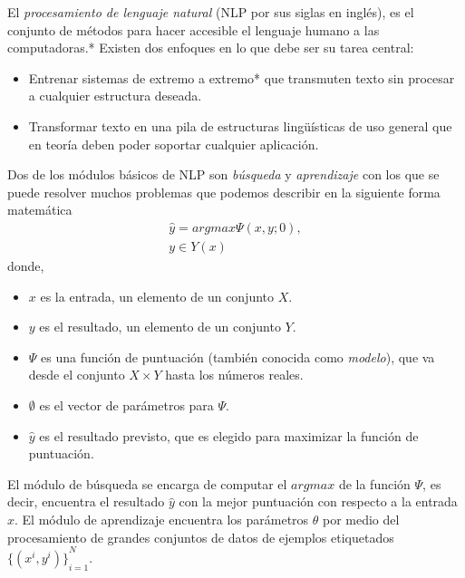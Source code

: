 El \emph{procesamiento de lenguaje natural} (NLP por sus siglas en inglés), es el conjunto de métodos para hacer accesible el lenguaje humano a las computadoras\cite{eise19}.* Existen dos enfoques en lo que debe ser su tarea central: 
\begin{itemize}
    \item Entrenar sistemas de extremo a extremo* que transmuten texto sin procesar a cualquier estructura deseada.
    \item Transformar texto en una pila de estructuras lingüísticas de uso general que en teoría deben poder soportar cualquier aplicación.
\end{itemize}
Dos de los módulos básicos de NLP son \emph{búsqueda} y \emph{aprendizaje} con los que se puede resolver muchos problemas que podemos describir en la siguiente forma matemática
\begin{equation}
\begin{matrix}
\hat{y}=argmax\Psi(x,y;0),\\
y\in Y(x)
\end{matrix}
\end{equation}
donde,
\begin{itemize}
    \item $x$ es la entrada, un elemento de un conjunto $X$.
    \item $y$ es el resultado, un elemento de un conjunto $Y$.
    \item $\Psi$ es una función de puntuación (también conocida como \emph{modelo}), que va desde el conjunto $X\times Y$ hasta los números reales.
    \item $\emptyset$ es el vector de parámetros para $\Psi$.
    \item $\hat{y}$ es el resultado previsto, que es elegido para maximizar la función de puntuación.
\end{itemize}
El módulo de búsqueda se encarga de computar el $argmax$ de la función $\Psi$, es decir, encuentra el resultado $\hat{y}$ con la mejor puntuación con respecto a la entrada $x$. El módulo de aprendizaje encuentra los parámetros $\theta$ por medio del procesamiento de grandes conjuntos de datos de ejemplos etiquetados ${\{(x^i,y^i)\}}_{i=1}^{N}$.